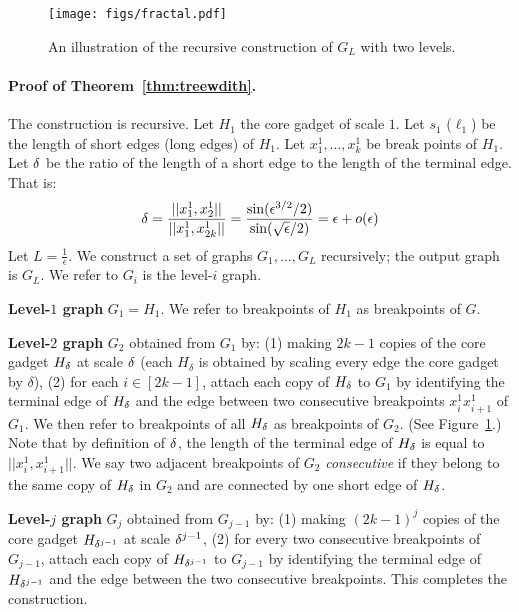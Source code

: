 \begin{figure}[h]
	\centering
	\vspace{0pt}
	\texttt{[image: figs/fractal.pdf]}
	\caption{\footnotesize{An illustration of the recursive construction of $G_L$ with two levels.}}
	\label{fig:fractal}
\end{figure}

\paragraph{Proof of Theorem~\ref{thm:treewdith}.~} The construction is recursive. Let $H_1$ the core gadget of scale $1$.  Let $s_1$ ($\ell_1$) be the length of short  edges (long edges) of $H_1$. Let $x^1_1,\ldots, x^1_k$ be break points of $H_1$. Let $\delta$ be the ratio of  the length of a short edge to the length of the terminal edge. That is:
\begin{equation}
\delta = \frac{||x^1_1,x^1_2||}{||x^1_1,x^1_{2k}||} = \frac{\sin(\epsilon^{3/2}/2)}{\sin(\sqrt{\epsilon}/2)} = \epsilon + o(\epsilon)
\end{equation}
 Let $L = \frac{1}{\epsilon}$. We construct a set of graphs $G_1,\ldots, G_L$ recursively; the output graph is $G_L$. We refer to $G_i$ is the level-$i$ graph.


\noindent \textbf{Level-$1$ graph} $G_1 = H_1$. We refer to breakpoints of $H_1$ as breakpoints of $G$.


\noindent \textbf{Level-$2$ graph} $G_2$ obtained from $G_1$ by: (1) making $2k-1$ copies of the core gadget $H_{\delta}$ at scale $\delta$ (each $H_\delta$ is obtained by scaling every edge the core gadget by $\delta$), (2) for each $i \in [2k-1]$, attach each copy of $H_{\delta}$ to $G_1$ by identifying the terminal edge of $H_{\delta}$ and the edge between two consecutive breakpoints $x^1_ix^1_{i+1}$ of $G_1$. We then refer to breakpoints of all $H_{\delta}$ as breakpoints of $G_2$. (See Figure~\ref{fig:fractal}.) Note that by definition of $\delta$, the length of the terminal edge of $H_{\delta}$ is equal to $||x^1_i,x^1_{i+1}||$. We say two adjacent breakpoints of $G_2$ \emph{consecutive} if they belong to the same copy of $H_{\delta}$ in $G_2$ and are connected by one short edge of $H_{\delta}$.


\noindent \textbf{Level-$j$ graph} $G_j$ obtained from $G_{j-1}$ by: (1) making $(2k-1)^j$ copies of the core gadget $H_{\delta^{j-1}}$ at scale $\delta^{j-1}$, (2) for every two consecutive breakpoints of $G_{j-1}$, attach each copy of $H_{\delta^{j-1}}$ to $G_{j-1}$ by identifying the terminal edge of $H_{\delta^{j-1}}$ and the edge between the two consecutive breakpoints. This completes the construction.


